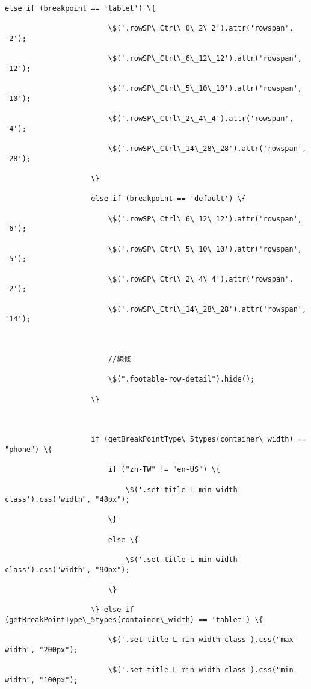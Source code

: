 \documentclass[11pt]{article}
\begin{document}
\begin{Verbatim}[commandchars=\\\{\}]
                    else if (breakpoint == 'tablet') \{

                        \$('.rowSP\_Ctrl\_0\_2\_2').attr('rowspan', '2');

                        \$('.rowSP\_Ctrl\_6\_12\_12').attr('rowspan', '12');

                        \$('.rowSP\_Ctrl\_5\_10\_10').attr('rowspan', '10');

                        \$('.rowSP\_Ctrl\_2\_4\_4').attr('rowspan', '4');

                        \$('.rowSP\_Ctrl\_14\_28\_28').attr('rowspan', '28');

                    \}

                    else if (breakpoint == 'default') \{

                        \$('.rowSP\_Ctrl\_6\_12\_12').attr('rowspan', '6');

                        \$('.rowSP\_Ctrl\_5\_10\_10').attr('rowspan', '5');

                        \$('.rowSP\_Ctrl\_2\_4\_4').attr('rowspan', '2');

                        \$('.rowSP\_Ctrl\_14\_28\_28').attr('rowspan', '14');



                        //線條

                        \$(".footable-row-detail").hide();

                    \}



                    if (getBreakPointType\_5types(container\_width) == "phone") \{

                        if ("zh-TW" != "en-US") \{

                            \$('.set-title-L-min-width-class').css("width", "48px");

                        \}

                        else \{

                            \$('.set-title-L-min-width-class').css("width", "90px");

                        \}

                    \} else if (getBreakPointType\_5types(container\_width) == 'tablet') \{

                        \$('.set-title-L-min-width-class').css("max-width", "200px");

                        \$('.set-title-L-min-width-class').css("min-width", "100px");


\end{Verbatim}
\end{document}

